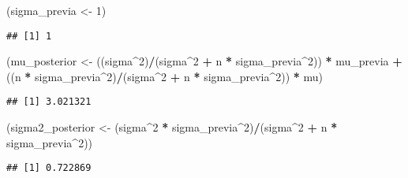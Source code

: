 \documentclass[
  12pt,
]{book}
\newenvironment{Shaded}{\begin{snugshade}}{\end{snugshade}}
\newcommand{\DecValTok}[1]{\textcolor[rgb]{0.00,0.00,0.81}{#1}}
\newcommand{\NormalTok}[1]{#1}
\newcommand{\OperatorTok}[1]{\textcolor[rgb]{0.81,0.36,0.00}{\textbf{#1}}}
\newcommand{\StringTok}[1]{\textcolor[rgb]{0.31,0.60,0.02}{#1}}
\begin{document}
\begin{Shaded}
\begin{Highlighting}[]
\NormalTok{(sigma\_previa \textless{}{-}}\StringTok{ }\DecValTok{1}\NormalTok{)}
\end{Highlighting}
\end{Shaded}

\begin{verbatim}
## [1] 1
\end{verbatim}

\begin{Shaded}
\begin{Highlighting}[]
\NormalTok{(mu\_posterior \textless{}{-}}\StringTok{ }\NormalTok{((sigma}\OperatorTok{\^{}}\DecValTok{2}\NormalTok{)}\OperatorTok{/}\NormalTok{(sigma}\OperatorTok{\^{}}\DecValTok{2} \OperatorTok{+}\StringTok{ }\NormalTok{n }\OperatorTok{*}\StringTok{ }\NormalTok{sigma\_previa}\OperatorTok{\^{}}\DecValTok{2}\NormalTok{)) }\OperatorTok{*}\StringTok{ }
\StringTok{    }\NormalTok{mu\_previa }\OperatorTok{+}\StringTok{ }\NormalTok{((n }\OperatorTok{*}\StringTok{ }\NormalTok{sigma\_previa}\OperatorTok{\^{}}\DecValTok{2}\NormalTok{)}\OperatorTok{/}\NormalTok{(sigma}\OperatorTok{\^{}}\DecValTok{2} \OperatorTok{+}\StringTok{ }\NormalTok{n }\OperatorTok{*}\StringTok{ }
\StringTok{    }\NormalTok{sigma\_previa}\OperatorTok{\^{}}\DecValTok{2}\NormalTok{)) }\OperatorTok{*}\StringTok{ }\NormalTok{mu)}
\end{Highlighting}
\end{Shaded}

\begin{verbatim}
## [1] 3.021321
\end{verbatim}

\begin{Shaded}
\begin{Highlighting}[]
\NormalTok{(sigma2\_posterior \textless{}{-}}\StringTok{ }\NormalTok{(sigma}\OperatorTok{\^{}}\DecValTok{2} \OperatorTok{*}\StringTok{ }\NormalTok{sigma\_previa}\OperatorTok{\^{}}\DecValTok{2}\NormalTok{)}\OperatorTok{/}\NormalTok{(sigma}\OperatorTok{\^{}}\DecValTok{2} \OperatorTok{+}\StringTok{ }
\StringTok{    }\NormalTok{n }\OperatorTok{*}\StringTok{ }\NormalTok{sigma\_previa}\OperatorTok{\^{}}\DecValTok{2}\NormalTok{))}
\end{Highlighting}
\end{Shaded}

\begin{verbatim}
## [1] 0.722869
\end{verbatim}
\end{document}
